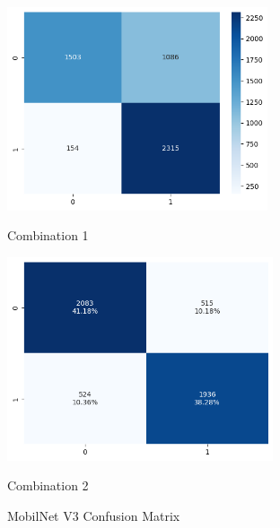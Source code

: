 \begin{figure}[H]
    \centering
    \begin{minipage}[b]{0.49\textwidth}
        \centering
        \includegraphics[width=\textwidth, height=6cm]{Figures/balanced_data/more_data/withoutbn/mn3/cm.png}
        \captionsetup{labelformat=empty}
        \caption{Combination 1}
        \label{fig:u_wo_r_cm}
    \end{minipage}
    \hfill
    \begin{minipage}[b]{0.49\textwidth}
        \centering
        \includegraphics[width=\textwidth, height=6cm]{Figures/balanced_data/more_data/withbn/mn3/cm.png}
        \captionsetup{labelformat=empty}
        \caption{Combination 2}
        \label{fig:u_w_r_cm}
    \end{minipage}
    \captionsetup{labelformat=default}
    \caption{MobilNet V3 Confusion Matrix}
\end{figure}



